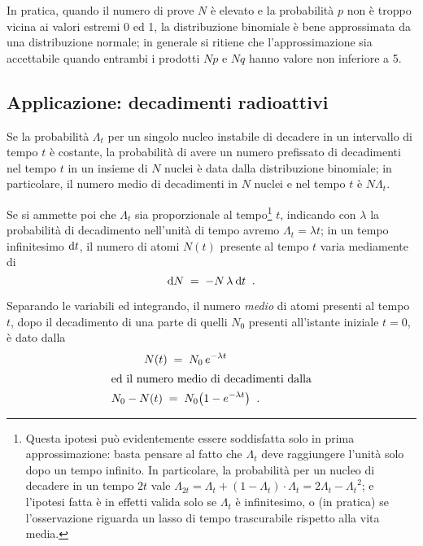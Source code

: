 In pratica, quando il numero di prove $N$ \`e elevato e la
probabilit\`a $p$ non \`e troppo vicina ai valori estremi 0
ed 1, la distribuzione binomiale \`e bene approssimata da
una distribuzione normale; in generale si ritiene che
l'approssimazione sia accettabile quando entrambi i prodotti
$Np$ e $Nq$ hanno valore non inferiore a 5.%
%

\subsection{Applicazione: decadimenti radioattivi}
Se la probabilit\`a $\Lambda_t$ per un singolo nucleo
instabile di decadere in un intervallo di tempo $t$ \`e
costante, la probabilit\`a di avere un numero prefissato di
decadimenti nel tempo $t$ in un insieme di $N$ nuclei \`e
data dalla distribuzione binomiale; in particolare, il
numero medio di decadimenti in $N$ nuclei e nel tempo $t$
\`e $N \Lambda_t$.

Se si ammette poi che $\Lambda_t$ sia proporzionale al
tempo\/\footnote{Questa ipotesi pu\`o evidentemente essere
  soddisfatta solo in prima approssimazione: basta pensare
  al fatto che $\Lambda_t$ deve raggiungere l'unit\`a solo
  dopo un tempo infinito.  In particolare, la probabilit\`a
  per un nucleo di decadere in un tempo $2t$ vale $
  \Lambda_{2t} = \Lambda_t + \left( 1 - \Lambda_t \right)
  \cdot \Lambda_t = 2 \Lambda_t - {\Lambda_t}^2$; e
  l'ipotesi fatta \`e in effetti valida solo se $\Lambda_t$
  \`e infinitesimo, o (in pratica) se l'osservazione
  riguarda un lasso di tempo trascurabile rispetto alla vita
  media.} $t$, indicando con $\lambda$ la probabilit\`a di
decadimento nell'unit\`a di tempo avremo $\Lambda_t =
\lambda t$; in un tempo infinitesimo $\mathrm{d} t$, il numero di
atomi $N(t)$ presente al tempo $t$ varia mediamente di
\begin{equation*}
  \mathrm{d} N \; = \; - N \, \lambda \:
  \mathrm{d} t \;\; .
\end{equation*}

Separando le variabili ed integrando, il numero \emph{medio}
di atomi presenti al tempo $t$, dopo il decadimento di una
parte di quelli $N_0$ presenti all'istante iniziale $t = 0$,
\`e dato dalla
\begin{gather}
  N(t) \; = \; N_0 \, e^{- \lambda t} \label{eq:8.nt1}
    \\
  \intertext{ed il numero medio di decadimenti dalla}
  N_0 - N(t) \; = \; N_0 \bigl( 1 - e^{- \lambda t}
    \bigr) \;\; . \notag
\end{gather}

